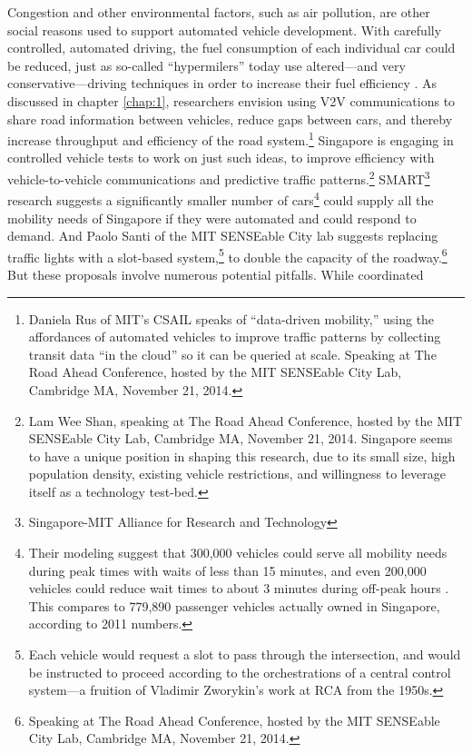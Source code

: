 Congestion and other environmental factors, such as air pollution, are
other social reasons used to support automated vehicle development.
With carefully controlled, automated driving, the fuel consumption of each
individual car could be reduced, just as so-called ``hypermilers''
today use altered---and very conservative---driving techniques in
order to increase their fuel efficiency \cite{orourkeHypermile}. As discussed in
chapter \ref{chap:1}, researchers envision using V2V communications to
share road information between vehicles, reduce gaps between cars, and
thereby increase throughput and efficiency of the road
system.\footnote{Daniela Rus of MIT's CSAIL speaks of ``data-driven
  mobility,'' using
the affordances of automated vehicles to improve traffic
patterns by collecting transit data ``in the cloud'' so it can be
queried at scale. Speaking at The Road Ahead Conference, hosted by
  the MIT SENSEable City Lab, Cambridge MA, November 21, 2014.} Singapore is engaging in
controlled vehicle tests to work on just such ideas, to improve
efficiency with vehicle-to-vehicle communications and predictive traffic
patterns.\footnote{Lam Wee Shan, speaking at The Road Ahead Conference, hosted by
  the MIT SENSEable City Lab, Cambridge MA, November 21, 2014.
  Singapore seems to have a unique position in shaping this research,
  due to its small size, high population density, existing vehicle
  restrictions, and willingness to 
  leverage itself as a technology test-bed.}
SMART\footnote{Singapore-MIT Alliance for Research and Technology}
research suggests a
significantly smaller number of cars\footnote{Their modeling suggest that 300,000
  vehicles could serve 
all mobility needs during peak times with waits of less than 15
minutes, and even 200,000 vehicles could reduce wait times
to about 3 minutes during off-peak hours \cite{frazzoliSingapore}. This
compares to 779,890 passenger vehicles actually owned in Singapore,
according to 2011 numbers.} could supply all the mobility
needs of Singapore if they were automated and could respond to
demand. And Paolo
Santi of the MIT SENSEable City lab suggests replacing traffic lights
with a slot-based system,\footnote{Each vehicle would request a slot to pass through the
intersection, and would be instructed to proceed according to the
orchestrations of a central control system---a fruition of
Vladimir Zworykin's work at RCA from the 1950s.} to double the capacity of the
roadway.\footnote{Speaking at The Road Ahead Conference, hosted by
  the MIT SENSEable City Lab, Cambridge MA, November 21, 2014.} But
these proposals involve numerous potential pitfalls. While coordinated
